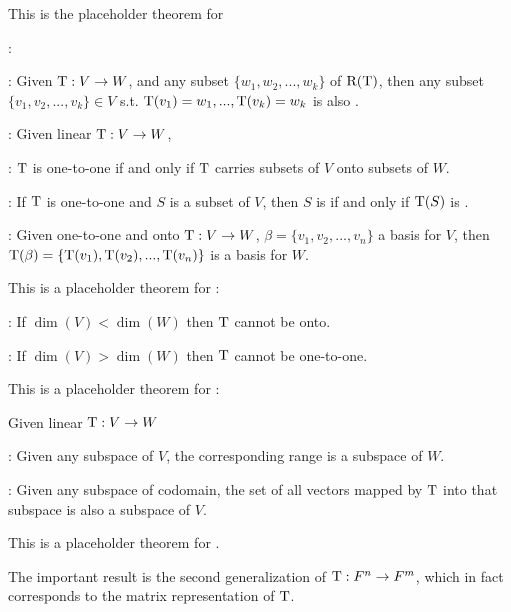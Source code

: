 \begin{additional theorem} \label{athm 2.2}
This is the placeholder theorem for

: 

: Given \(\mathrm{T} : V \to W\), and any \LID{} subset \(\{ w_1, w_2, ..., w_k \}\) of \(\mathrm{R(T)}\), then any subset \(\{ v_1, v_2, ..., v_k \} \in V\) s.t. \(\mathrm{T}(v_1) = w_1, ..., \mathrm{T}(v_k) = w_k\) is also \LID{}.

: Given linear \(\mathrm{T} : V \to W\),

: \(\mathrm{T}\) is one-to-one if and only if \(\mathrm{T}\) carries \LID{} subsets of \(V\) onto \LID{} subsets of \(W\).

: If \(\mathrm{T}\) is one-to-one and \(S\) is a subset of \(V\), then \(S\) is \LID{} if and only if \(\mathrm{T}(S)\) is \LID{}.

: Given one-to-one and onto \(\mathrm{T} : V \to W\), \(\beta = \{ v_1, v_2, ..., v_n \}\) a basis for \(V\), then\\
\(\mathrm{T}(\beta) = \{ \mathrm{T}(v_1), \mathrm{T}(v_2), ..., \mathrm{T}(v_n) \}\) is a basis for \(W\).
\end{additional theorem}

\begin{additional theorem} \label{athm 2.3}
This is a placeholder theorem for :

: If \(\dim(V) < \dim(W)\) then \(\mathrm{T}\) cannot be onto.

: If \(\dim(V) > \dim(W)\) then \(\mathrm{T}\) cannot be one-to-one.
\end{additional theorem}

\begin{additional theorem} \label{athm 2.4}
This is a placeholder theorem for :

Given linear \(\mathrm{T} : V \to W\)

: Given any subspace of \(V\), the corresponding range is a subspace of \(W\).

: Given any subspace of codomain, the set of all vectors mapped by \(\mathrm{T}\) into that subspace is also a subspace of \(V\).
\end{additional theorem}

\begin{additional theorem} \label{athm 2.5}
This is a placeholder theorem for .

The important result is the second generalization of \(\mathrm{T} : F^n \to F^m\), which in fact corresponds to the matrix representation of \(\mathrm{T}\).
\end{additional theorem}

